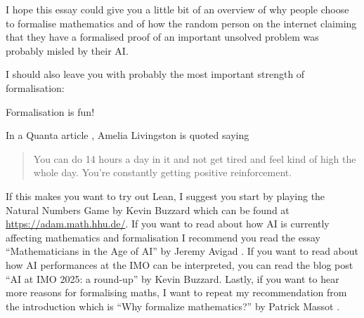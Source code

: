I hope this essay could give you a little bit of an overview of why people choose to formalise mathematics and of how the random person on the internet claiming that they have a formalised proof of an important unsolved problem was probably misled by their AI. 

I should also leave you with probably the most important strength of formalisation: 

\begin{strength}
    Formalisation is fun!
\end{strength}

In a Quanta article \cite{Quanta}, Amelia Livingston is quoted saying

\begin{quote}
You can do 14 hours a day in it and not get tired and feel kind of high the whole day. You’re constantly getting positive reinforcement.
\end{quote}

If this makes you want to try out Lean, I suggest you start by playing the Natural Numbers Game by Kevin Buzzard which can be found at \url{https://adam.math.hhu.de/}. If you want to read about how AI is currently affecting mathematics and formalisation I recommend you read the essay ``Mathematicians in the Age of AI'' by Jeremy Avigad \cite{avigad}. If you want to read about how AI performances at the IMO can be interpreted, you can read the blog post ``AI at IMO 2025: a round-up'' by Kevin Buzzard. Lastly, if you want to hear more reasons for formalising maths, I want to repeat my recommendation from the introduction which is ``Why formalize mathematics?'' by Patrick Massot \cite{Massot2021WhyFM}.







